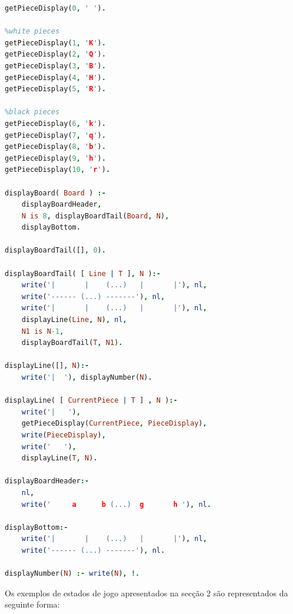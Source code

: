 \documentclass[a4paper]{article}
\begin{document}
\begin{lstlisting}[language=Prolog]
getPieceDisplay(0, ' ').

%white pieces
getPieceDisplay(1, 'K').
getPieceDisplay(2, 'Q'). 
getPieceDisplay(3, 'B'). 
getPieceDisplay(4, 'H'). 
getPieceDisplay(5, 'R').

%black pieces
getPieceDisplay(6, 'k'). 
getPieceDisplay(7, 'q').
getPieceDisplay(8, 'b'). 
getPieceDisplay(9, 'h').
getPieceDisplay(10, 'r').

displayBoard( Board ) :-
	displayBoardHeader,
	N is 8, displayBoardTail(Board, N),
	displayBottom.

displayBoardTail([], 0).

displayBoardTail( [ Line | T ], N ):-
	write('|       |    (...)   |       |'), nl,
	write('------ (...) -------'), nl,
	write('|       |    (...)   |       |'), nl,
	displayLine(Line, N), nl,
	N1 is N-1,
	displayBoardTail(T, N1).

displayLine([], N):- 
	write('|  '), displayNumber(N).

displayLine( [ CurrentPiece | T ] , N ):-
	write('|   '),
	getPieceDisplay(CurrentPiece, PieceDisplay),
	write(PieceDisplay),
	write('   '),
	displayLine(T, N).

displayBoardHeader:- 
	nl,
	write('     a      b (...)  g       h '), nl.

displayBottom:-
	write('|       |    (...)   |       |'), nl,
	write('------ (...) -------'), nl.

displayNumber(N) :- write(N), !.
\end{lstlisting}

Os exemplos de estados de jogo apresentados na secção 2 são representados da seguinte forma:
\end{document}
